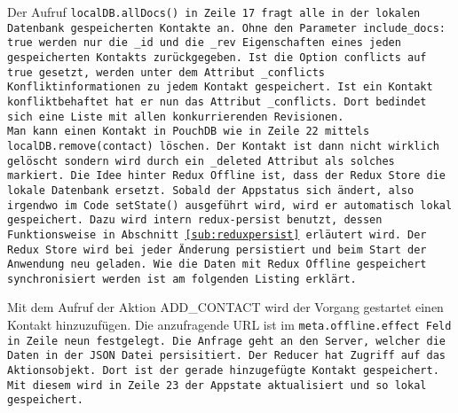 Der Aufruf \tt{localDB.allDocs()} in Zeile 17 fragt alle in der lokalen Datenbank gespeicherten Kontakte an. Ohne den Parameter \tt{include\_docs: true} werden nur die \tt{\_id} und die \tt{\_rev} Eigenschaften eines jeden gespeicherten Kontakts zurückgegeben. Ist die Option \tt{conflicts} auf \tt{true} gesetzt, werden unter dem Attribut \tt{\_conflicts} Konfliktinformationen zu jedem Kontakt gespeichert. Ist ein Kontakt konfliktbehaftet hat er nun das Attribut \tt{\_conflicts}. Dort bedindet sich eine Liste mit allen konkurrierenden Revisionen.\\
Man kann einen Kontakt in PouchDB wie in Zeile 22 mittels \tt{localDB.remove(contact)} löschen. Der Kontakt ist dann nicht wirklich gelöscht sondern wird durch ein \tt{\_deleted} Attribut als solches markiert.
%
%
Die Idee hinter Redux Offline ist, dass der Redux Store die lokale Datenbank ersetzt. Sobald der Appstatus sich ändert, also irgendwo im Code \tt{setState()} ausgeführt wird, wird er automatisch lokal gespeichert. Dazu wird intern \tt{redux-persist} benutzt, dessen Funktionsweise in Abschnitt \ref{sub:reduxpersist} erläutert wird. Der Redux Store wird bei jeder Änderung persistiert und beim Start der Anwendung neu geladen.
Wie die Daten mit Redux Offline gespeichert synchronisiert werden ist am folgenden Listing erklärt.
\begin{center}  
\end{center}
%
Mit dem Aufruf der Aktion ADD\_CONTACT wird der Vorgang gestartet einen Kontakt hinzuzufügen. Die anzufragende URL ist im \tt{meta.offline.effect} Feld in Zeile neun festgelegt. Die Anfrage geht an den Server, welcher die Daten in der \gls{JSON} Datei persisitiert.
Der Reducer hat Zugriff auf das Aktionsobjekt. Dort ist der gerade hinzugefügte Kontakt gespeichert. Mit diesem wird in Zeile 23 der Appstate aktualisiert und so lokal gespeichert.\\
